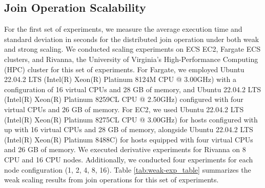 \subsection{Join Operation Scalability}

For the first set of experiments, we measure the average execution time and standard deviation in seconds for the distributed join operation under both weak and strong scaling. We conducted scaling experiments on ECS EC2, Fargate ECS clusters, and Rivanna, the University of Virginia's High-Performance Computing (HPC) cluster for this set of experiments. For Fargate, we employed Ubuntu 22.04.2 LTS (Intel(R) Xeon(R) Platinum 8124M CPU @ 3.00GHz) with a configuration of 16 virtual CPUs and 28 GB of memory, and Ubuntu 22.04.2 LTS (Intel(R) Xeon(R) Platinum 8259CL CPU @ 2.50GHz) configured with four virtual CPUs and 26 GB of memory. For EC2, we used Ubuntu 22.04.2 LTS (Intel(R) Xeon(R) Platinum 8275CL CPU @ 3.00GHz) for hosts configured with up with 16 virtual CPUs and 28 GB of memory, alongside Ubuntu 22.04.2 LTS (Intel(R) Xeon(R) Platinum 8488C) for hosts equipped with four virtual CPUs and 26 GB of memory. We executed derivative experiments for Rivanna on 8 CPU and 16 CPU nodes. Additionally, we conducted four experiments for each node configuration (1, 2, 4, 8, 16). Table \ref{tab:weak-exp_table} summarizes the weak scaling results from join operations for this set of experiments. 


